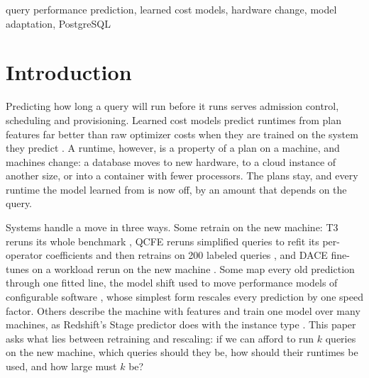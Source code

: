 \documentclass[conference]{IEEEtran}
\begin{document}
\begin{IEEEkeywords}
query performance prediction, learned cost models, hardware change, model adaptation, PostgreSQL
\end{IEEEkeywords}

\section{Introduction}
\label{sec:intro}
Predicting how long a query will run before it runs serves admission
control, scheduling and provisioning. Learned cost
models predict runtimes from plan features far better than raw optimizer
costs when they are trained on the system they predict
\cite{ganapathi2009,akdere2012,marcus2019,sun2020}. A runtime, however, is
a property of a plan on a machine, and machines change: a database moves to
new hardware, to a cloud instance of another size, or into a container with
fewer processors. The plans stay, and every runtime the model learned from
is now off, by an amount that depends on the query.

Systems handle a move in three ways. Some retrain on the new machine: T3
reruns its whole benchmark \cite{rieger2025t3}, QCFE reruns simplified
queries to refit its per-operator coefficients and then retrains on 200
labeled queries \cite{yan2024qcfe}, and DACE fine-tunes on a workload rerun
on the new machine \cite{liang2024dace}. Some map every old prediction
through one fitted line, the model shift used to move performance models of
configurable software \cite{valov2017,jamshidi2017}, whose simplest form
rescales every prediction by one speed factor. Others describe the machine
with features and train one model over many machines, as Redshift's Stage
predictor does with the instance type \cite{wu2024stage}. This paper asks
what lies between retraining and rescaling: if we can afford to run $k$
queries on the new machine, which queries should they be, how should their
runtimes be used, and how large must $k$ be?
\end{document}
